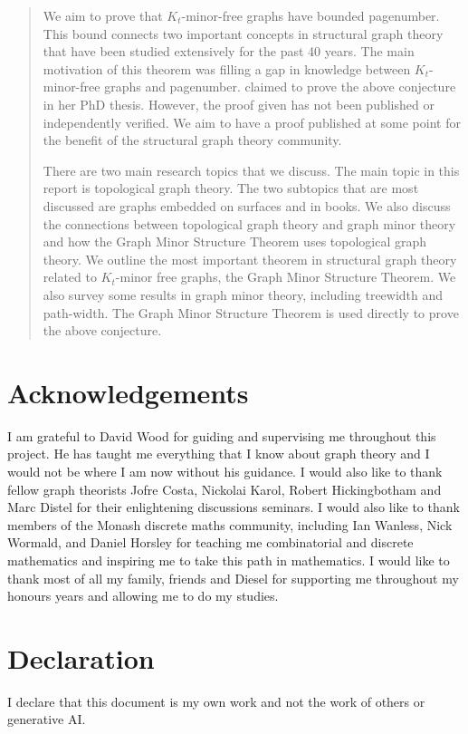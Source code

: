 \begin{abstract}
	We aim to prove that \(K_t\)-minor-free graphs have bounded pagenumber. This bound connects two important concepts in structural graph theory that have been studied extensively for the past 40 years. The main motivation of this theorem was filling a gap in knowledge between $K_t$-minor-free graphs and pagenumber. \textcite{Blankenship-PhD03} claimed to prove the above conjecture in her PhD thesis. However, the proof given has not been published or independently verified. We aim to have a proof published at some point for the benefit of the structural graph theory community. 

	There are two main research topics that we discuss.
	The main topic in this report is topological graph theory. The two subtopics that are most discussed are graphs embedded on surfaces and in books. We also discuss the connections between topological graph theory and graph minor theory and how the Graph Minor Structure Theorem uses topological graph theory. 
	We outline the most important theorem in structural graph theory related to \(K_t\)-minor free graphs, the Graph Minor Structure Theorem. We also survey some results in graph minor theory, including treewidth and path-width. The Graph Minor Structure Theorem is used directly to prove the above conjecture. 
\end{abstract}

\section{Acknowledgements}
I am grateful to David Wood for guiding and supervising me throughout this project. He has taught me everything that I know about graph theory and I would not be where I am now without his guidance. I would also like to thank fellow graph theorists Jofre Costa, Nickolai Karol, Robert Hickingbotham and Marc Distel for their enlightening discussions seminars. I would also like to thank members of the Monash discrete maths community, including Ian Wanless, Nick Wormald, and Daniel Horsley for teaching me combinatorial and discrete mathematics and inspiring me to take this path in mathematics. I would like to thank most of all my family, friends and Diesel for supporting me throughout my honours years and allowing me to do my studies.

\section{Declaration}

I declare that this document is my own work and not the work of others or generative AI. 